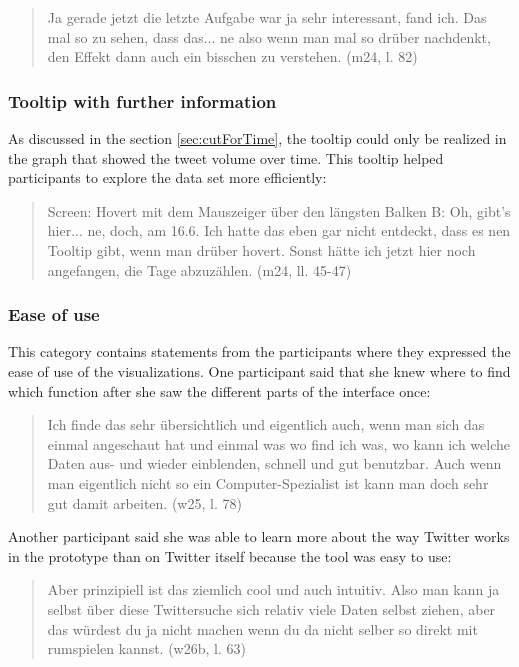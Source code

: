 \begin{quote}
    Ja gerade jetzt die letzte Aufgabe war ja sehr interessant, fand ich. Das mal so zu sehen, dass das... ne also wenn man mal so drüber nachdenkt, den Effekt dann auch ein bisschen zu verstehen. (m24, l. 82)
\end{quote}

\subsubsection*{Tooltip with further information}
As discussed in the section \ref{sec:cutForTime}, the tooltip could only be realized in the graph that showed the tweet volume over time. This tooltip helped participants to explore the data set more efficiently:

\begin{quote}
    Screen: Hovert mit dem Mauszeiger über den längsten Balken
    B: Oh, gibt's hier... ne, doch, am 16.6. Ich hatte das eben gar nicht entdeckt, dass es nen Tooltip gibt, wenn man drüber hovert. Sonst hätte ich jetzt hier noch angefangen, die Tage abzuzählen. (m24, ll. 45-47)
\end{quote}

\subsubsection*{Ease of use}
This category contains statements from the participants where they expressed the ease of use of the visualizations. One participant said that she knew where to find which function after she saw the different parts of the interface once:

\begin{quote}
    Ich finde das sehr übersichtlich und eigentlich auch, wenn man sich das einmal angeschaut hat und einmal was wo find ich was, wo kann ich welche Daten aus- und wieder einblenden, schnell und gut benutzbar. Auch wenn man eigentlich nicht so ein Computer-Spezialist ist kann man doch sehr gut damit arbeiten. (w25, l. 78)
\end{quote}

Another participant said she was able to learn more about the way Twitter works in the prototype than on Twitter itself because the tool was easy to use:

\begin{quote}
    Aber prinzipiell ist das ziemlich cool und auch intuitiv. Also man kann ja selbst über diese Twittersuche sich relativ viele Daten selbst ziehen, aber das würdest du ja nicht machen wenn du da nicht selber so direkt mit rumspielen kannst. (w26b, l. 63)
\end{quote}

